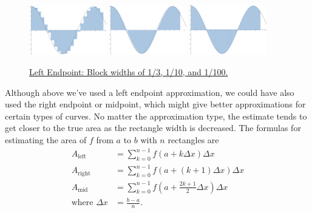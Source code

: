 \begin{figure}[H]
	\label{cos_blocks}
	\centering
	\includegraphics[width = 0.3\textwidth]{./integrals/cos_blocks1.png}
	\includegraphics[width = 0.3\textwidth]{./integrals/cos_blocks2.png}
	\includegraphics[width = 0.3\textwidth]{./integrals/cos_blocks3.png}
	\caption{\hyperref{}{}{}{Left Endpoint: Block widths of 1/3, 1/10, and 1/100.}}
\end{figure}


Although above we've used a left endpoint approximation, we could have also used the right endpoint or midpoint, which might give better approximations for certain types of curves.
No matter the approximation type, the estimate tends to get closer to the true area as the rectangle width is decreased.
The formulas for estimating the area of $f$ from $a$ to $b$ with $n$ rectangles are
\begin{align*}
	A_\text{left} &= \sum_{k=0}^{n-1}{f\left(a+k\Delta x\right)\Delta x} \\
	A_\text{right} &= \sum_{k=0}^{n-1}{f\left(a+(k+1)\Delta x\right)\Delta x} \\
	A_\text{mid} &= \sum_{k=0}^{n-1}{f\left(a+\frac{2k+1}{2}\Delta x\right)\Delta x} \\
	\text{where }\Delta x &= \frac{b-a}{n}.
\end{align*}

